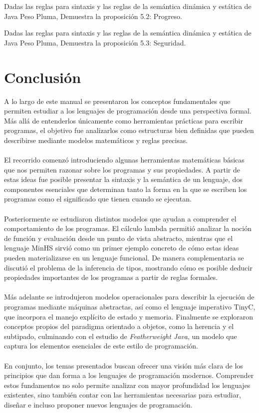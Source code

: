 \begin{exercise}
   Dadas las reglas para sintaxis y las reglas de la semántica dinámica y estática de \textsf{Java Peso Pluma}, Demuestra la proposición 5.2: Progreso.
\end{exercise}



\begin{exercise}
   Dadas las reglas para sintaxis y las reglas de la semántica dinámica y estática de \textsf{Java Peso Pluma}, Demuestra la proposición 5.3: Seguridad.
\end{exercise}


\newpage

\chapter*{Conclusión}

A lo largo de este manual se presentaron los conceptos fundamentales que permiten estudiar a los lenguajes de programación desde una perspectiva formal. Más allá de entenderlos únicamente como herramientas prácticas para escribir programas, el objetivo fue analizarlos como estructuras bien definidas que pueden describirse mediante modelos matemáticos y reglas precisas.\\\\
El recorrido comenzó introduciendo algunas herramientas matemáticas básicas que nos permiten razonar sobre los programas y sus propiedades. A partir de estas ideas fue posible presentar la sintaxis y la semántica de un lenguaje, dos componentes esenciales que determinan tanto la forma en la que se escriben los programas como el significado que tienen cuando se ejecutan.\\\\
Posteriormente se estudiaron distintos modelos que ayudan a comprender el comportamiento de los programas. El cálculo lambda permitió analizar la noción de función y evaluación desde un punto de vista abstracto, mientras que el lenguaje \textsf{MinHS} sirvió como un primer ejemplo concreto de cómo estas ideas pueden materializarse en un lenguaje funcional. De manera complementaria se discutió el problema de la inferencia de tipos, mostrando cómo es posible deducir propiedades importantes de los programas a partir de reglas formales.\\\\
Más adelante se introdujeron modelos operacionales para describir la ejecución de programas mediante máquinas abstractas, así como el lenguaje imperativo \textsf{TinyC}, que incorpora el manejo explícito de estado y memoria. Finalmente se exploraron conceptos propios del paradigma orientado a objetos, como la herencia y el subtipado, culminando con el estudio de \textit{Featherweight Java}, un modelo que captura los elementos esenciales de este estilo de programación.\\\\
En conjunto, los temas presentados buscan ofrecer una visión más clara de los principios que dan forma a los lenguajes de programación modernos. Comprender estos fundamentos no solo permite analizar con mayor profundidad los lenguajes existentes, sino también contar con las herramientas necesarias para estudiar, diseñar e incluso proponer nuevos lenguajes de programación.